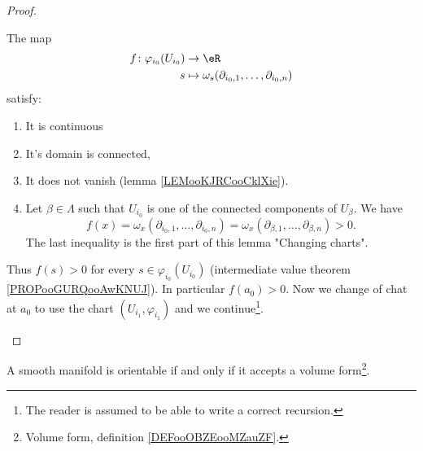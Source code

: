 \begin{proof}
\begin{subproof}
		The map
		\begin{equation}
			\begin{aligned}
				f\colon \varphi_{i_0}(U_{i_0}) & \to \eR                                                    \\
				s                              & \mapsto \omega_s(\partial_{i_0,1},\ldots,\partial_{i_0,n})
			\end{aligned}
		\end{equation}
		satisfy:
		\begin{enumerate}
			\item
			      It is continuous
			\item
			      It's domain is connected,
			\item
			      It does not vanish (lemma \ref{LEMooKJRCooCklXie}).
			\item
			      Let \( \beta\in\Lambda\) such that \( U_{i_0}\) is one of the connected components of \( U_{\beta}\). We have
			      \begin{equation}
				      f(x)=\omega_x(\partial_{i_0,1},\ldots,\partial_{i_0,n})=\omega_x(\partial_{\beta,1},\ldots,\partial_{\beta,n})>0.
			      \end{equation}
			      The last inequality is the first part of this lemma "Changing charts".
		\end{enumerate}
		Thus \( f(s)>0\) for every \( s\in \varphi_{i_0}(U_{i_0})\) (intermediate value theorem \ref{PROPooGURQooAwKNUJ}). In particular \( f(a_0)>0\). Now we change of chat at \( a_0\) to use the chart \( (U_{i_1},\varphi_{i_1})\) and we continue\footnote{The reader is assumed to be able to write a correct recursion.}.
	\end{subproof}
\end{proof}


\begin{theorem}	\label{THOooQEFUooQTtPDD}
	A smooth manifold is orientable if and only if it accepts a volume form\footnote{Volume form, definition \ref{DEFooOBZEooMZauZF}.}.
\end{theorem}


